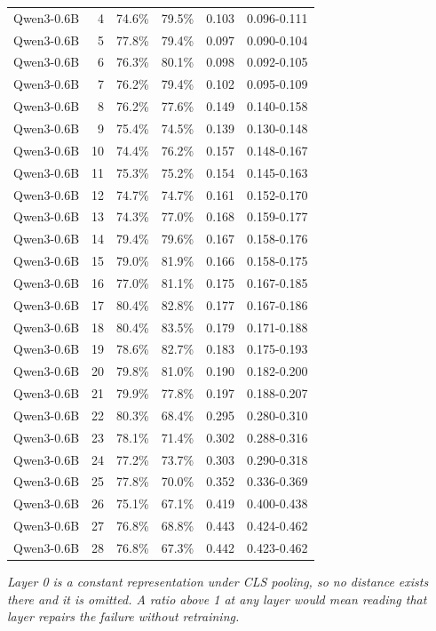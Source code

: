 \documentclass[10pt]{article}
\begin{document}
\begin{longtable}{lrrrrr}
Qwen3-0.6B & 4 & 74.6\% & 79.5\% & 0.103 & 0.096-0.111 \\
Qwen3-0.6B & 5 & 77.8\% & 79.4\% & 0.097 & 0.090-0.104 \\
Qwen3-0.6B & 6 & 76.3\% & 80.1\% & 0.098 & 0.092-0.105 \\
Qwen3-0.6B & 7 & 76.2\% & 79.4\% & 0.102 & 0.095-0.109 \\
Qwen3-0.6B & 8 & 76.2\% & 77.6\% & 0.149 & 0.140-0.158 \\
Qwen3-0.6B & 9 & 75.4\% & 74.5\% & 0.139 & 0.130-0.148 \\
Qwen3-0.6B & 10 & 74.4\% & 76.2\% & 0.157 & 0.148-0.167 \\
Qwen3-0.6B & 11 & 75.3\% & 75.2\% & 0.154 & 0.145-0.163 \\
Qwen3-0.6B & 12 & 74.7\% & 74.7\% & 0.161 & 0.152-0.170 \\
Qwen3-0.6B & 13 & 74.3\% & 77.0\% & 0.168 & 0.159-0.177 \\
Qwen3-0.6B & 14 & 79.4\% & 79.6\% & 0.167 & 0.158-0.176 \\
Qwen3-0.6B & 15 & 79.0\% & 81.9\% & 0.166 & 0.158-0.175 \\
Qwen3-0.6B & 16 & 77.0\% & 81.1\% & 0.175 & 0.167-0.185 \\
Qwen3-0.6B & 17 & 80.4\% & 82.8\% & 0.177 & 0.167-0.186 \\
Qwen3-0.6B & 18 & 80.4\% & 83.5\% & 0.179 & 0.171-0.188 \\
Qwen3-0.6B & 19 & 78.6\% & 82.7\% & 0.183 & 0.175-0.193 \\
Qwen3-0.6B & 20 & 79.8\% & 81.0\% & 0.190 & 0.182-0.200 \\
Qwen3-0.6B & 21 & 79.9\% & 77.8\% & 0.197 & 0.188-0.207 \\
Qwen3-0.6B & 22 & 80.3\% & 68.4\% & 0.295 & 0.280-0.310 \\
Qwen3-0.6B & 23 & 78.1\% & 71.4\% & 0.302 & 0.288-0.316 \\
Qwen3-0.6B & 24 & 77.2\% & 73.7\% & 0.303 & 0.290-0.318 \\
Qwen3-0.6B & 25 & 77.8\% & 70.0\% & 0.352 & 0.336-0.369 \\
Qwen3-0.6B & 26 & 75.1\% & 67.1\% & 0.419 & 0.400-0.438 \\
Qwen3-0.6B & 27 & 76.8\% & 68.8\% & 0.443 & 0.424-0.462 \\
Qwen3-0.6B & 28 & 76.8\% & 67.3\% & 0.442 & 0.423-0.462 \\
\end{longtable}
\normalsize

\textit{Layer 0 is a constant representation under CLS pooling, so no distance exists there and it is omitted. A ratio above 1 at any layer would mean reading that layer repairs the failure without retraining.}
\clearpage
\end{document}
